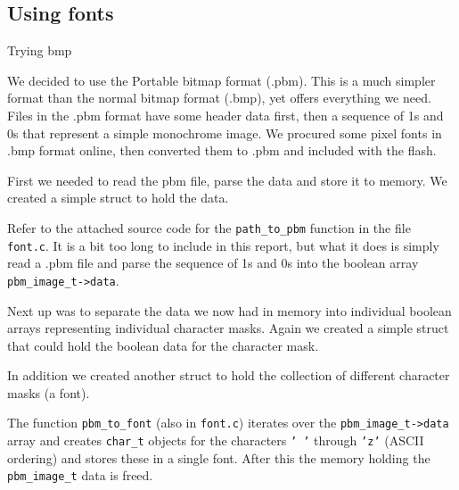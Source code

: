 \subsection{Using fonts}

Trying bmp

We decided to use the Portable bitmap format (.pbm).
This is a much simpler format than the normal bitmap format (.bmp),
yet offers everything we need.
Files in the .pbm format have some header data first, then a sequence of 1s and 0s that represent a simple monochrome image.
We procured some pixel fonts in .bmp format online, then converted them to .pbm and included with the flash.

First we needed to read the pbm file, parse the data and store it to memory.
We created a simple struct to hold the data.



Refer to the attached source code for the \texttt{path\_to\_pbm} function in the file \texttt{font.c}.
It is a bit too long to include in this report, but what it does is simply read a .pbm file and parse the sequence of 1s and 0s into the boolean array \texttt{pbm\_image\_t->data}.

Next up was to separate the data we now had in memory into individual boolean arrays representing individual character masks.
Again we created a simple struct that could hold the boolean data for the character mask.



In addition we created another struct to hold the collection of different character masks (a font).



The function \texttt{pbm\_to\_font} (also in \texttt{font.c}) iterates over the \texttt{pbm\_image\_t->data} array and creates \texttt{char\_t} objects for the characters \texttt{' '} through \texttt{'z'} (ASCII ordering) and stores these in a single font.
After this the memory holding the \texttt{pbm\_image\_t} data is freed.

